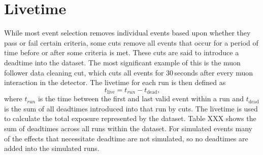\section{Livetime}
While most event selection removes individual events based upon whether they
pass or fail certain criteria, some cuts remove all events that occur for a
period of time before or after some criteria is met.
These cuts are said to introduce a deadtime into the dataset.
The most significant example of this is the muon follower data cleaning cut, which
cuts all events for 30\,seconds after every muon interaction in the detector.
The livetime for each run is then defined as
\begin{equation}
    t_{\mathrm{live}} = t_{run} - t_{\mathrm{dead}}\text{,}
\end{equation}
where $t_{run}$ is the time between the first and last valid event within a run
and $t_{\mathrm{dead}}$ is the sum of all deadtimes introduced into that run by cuts.
The livetime is used to calculate the total exposure represented by the dataset.
Table XXX shows the sum of deadtimes across all runs within the dataset.
For simulated events many of the effects that necessitate deadtime are not simulated,
so no deadtimes are added into the simulated runs.
